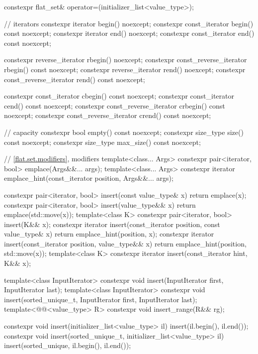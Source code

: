 \begin{codeblock}
{{    constexpr flat_set& operator=(initializer_list<value_type>);

    // iterators
    constexpr iterator               begin() noexcept;
    constexpr const_iterator         begin() const noexcept;
    constexpr iterator               end() noexcept;
    constexpr const_iterator         end() const noexcept;

    constexpr reverse_iterator       rbegin() noexcept;
    constexpr const_reverse_iterator rbegin() const noexcept;
    constexpr reverse_iterator       rend() noexcept;
    constexpr const_reverse_iterator rend() const noexcept;

    constexpr const_iterator         cbegin() const noexcept;
    constexpr const_iterator         cend() const noexcept;
    constexpr const_reverse_iterator crbegin() const noexcept;
    constexpr const_reverse_iterator crend() const noexcept;

    // capacity
    constexpr bool empty() const noexcept;
    constexpr size_type size() const noexcept;
    constexpr size_type max_size() const noexcept;

    // \ref{flat.set.modifiers}, modifiers
    template<class... Args> constexpr pair<iterator, bool> emplace(Args&&... args);
    template<class... Args>
      constexpr iterator emplace_hint(const_iterator position, Args&&... args);

    constexpr pair<iterator, bool> insert(const value_type& x)
      { return emplace(x); }
    constexpr pair<iterator, bool> insert(value_type&& x)
      { return emplace(std::move(x)); }
    template<class K> constexpr pair<iterator, bool> insert(K&& x);
    constexpr iterator insert(const_iterator position, const value_type& x)
      { return emplace_hint(position, x); }
    constexpr iterator insert(const_iterator position, value_type&& x)
      { return emplace_hint(position, std::move(x)); }
    template<class K> constexpr iterator insert(const_iterator hint, K&& x);

    template<class InputIterator>
      constexpr void insert(InputIterator first, InputIterator last);
    template<class InputIterator>
      constexpr void insert(sorted_unique_t, InputIterator first, InputIterator last);
    template<@@<value_type> R>
      constexpr void insert_range(R&& rg);

    constexpr void insert(initializer_list<value_type> il)
      { insert(il.begin(), il.end()); }
    constexpr void insert(sorted_unique_t, initializer_list<value_type> il)
      { insert(sorted_unique, il.begin(), il.end()); }

}}
\end{codeblock}
